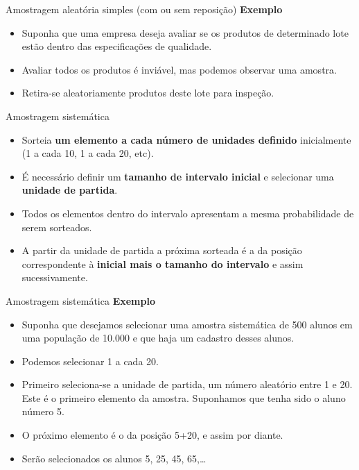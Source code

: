 \documentclass[
  ignorenonframetext,
  serif,
  professionalfont,
  usenames,
  dvipsnames,
  aspectratio = 169]{beamer}
\begin{document}
\begin{frame}{Amostragem aleatória simples (com ou sem reposição)}
\protect\hypertarget{amostragem-aleatuxf3ria-simples-com-ou-sem-reposiuxe7uxe3o-1}{}
\textbf{Exemplo}

\begin{itemize}
\item
  Suponha que uma empresa deseja avaliar se os produtos de determinado
  lote estão dentro das especificações de qualidade.
\item
  Avaliar todos os produtos é inviável, mas podemos observar uma
  amostra.
\item
  Retira-se aleatoriamente produtos deste lote para inspeção.
\end{itemize}
\end{frame}

\begin{frame}{Amostragem sistemática}
\protect\hypertarget{amostragem-sistemuxe1tica}{}
\begin{itemize}
\item
  Sorteia \textbf{um elemento a cada número de unidades definido}
  inicialmente (1 a cada 10, 1 a cada 20, etc).
\item
  É necessário definir um \textbf{tamanho de intervalo inicial} e
  selecionar uma \textbf{unidade de partida}.
\item
  Todos os elementos dentro do intervalo apresentam a mesma
  probabilidade de serem sorteados.
\item
  A partir da unidade de partida a próxima sorteada é a da posição
  correspondente à \textbf{inicial mais o tamanho do intervalo} e assim
  sucessivamente.
\end{itemize}
\end{frame}

\begin{frame}{Amostragem sistemática}
\protect\hypertarget{amostragem-sistemuxe1tica-1}{}
\textbf{Exemplo}

\begin{itemize}
\item
  Suponha que desejamos selecionar uma amostra sistemática de 500 alunos
  em uma população de 10.000 e que haja um cadastro desses alunos.
\item
  Podemos selecionar 1 a cada 20.
\item
  Primeiro seleciona-se a unidade de partida, um número aleatório entre
  1 e 20. Este é o primeiro elemento da amostra. Suponhamos que tenha
  sido o aluno número 5.
\item
  O próximo elemento é o da posição 5+20, e assim por diante.
\item
  Serão selecionados os alunos 5, 25, 45, 65,\ldots{}
\end{itemize}
\end{frame}
\end{document}
